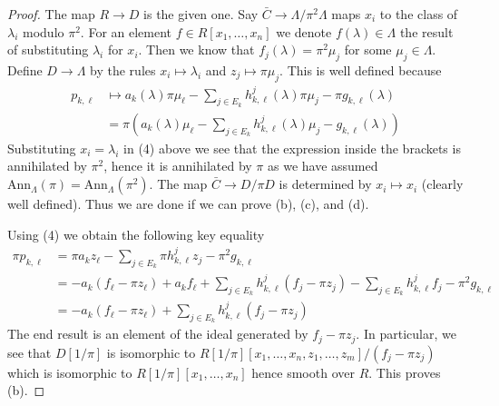 \begin{proof}
\medskip\noindent
The map $R \to D$ is the given one.
Say $\bar C \to \Lambda/\pi^2\Lambda$ maps $x_i$
to the class of $\lambda_i$ modulo $\pi^2$. For an element
$f \in R[x_1, \ldots, x_n]$ we denote $f(\lambda) \in \Lambda$
the result of substituting $\lambda_i$ for $x_i$. Then we know that
$f_j(\lambda) = \pi^2 \mu_j$ for some $\mu_j \in \Lambda$.
Define $D \to \Lambda$ by the rules $x_i \mapsto \lambda_i$ and
$z_j \mapsto \pi\mu_j$. This is well defined because
\begin{align*}
p_{k, \ell} & \mapsto
a_k(\lambda) \pi \mu_\ell -
\sum\nolimits_{j \in E_k} h_{k, \ell}^j(\lambda) \pi \mu_j
- \pi g_{k, \ell}(\lambda) \\
& =
\pi\left(a_k(\lambda) \mu_\ell -
\sum\nolimits_{j \in E_k} h_{k, \ell}^j(\lambda) \mu_j
- g_{k, \ell}(\lambda)\right)
\end{align*}
Substituting $x_i = \lambda_i$ in (4) above we see that the expression
inside the brackets is annihilated by $\pi^2$, hence it is annihilated
by $\pi$ as we have assumed
$\text{Ann}_\Lambda(\pi) = \text{Ann}_\Lambda(\pi^2)$.
The map $\bar C \to D/\pi D$ is determined by $x_i \mapsto x_i$
(clearly well defined). Thus we are done if we can prove (b), (c), and (d).

\medskip\noindent
Using (4) we obtain the following key equality
\begin{align*}
\pi p_{k, \ell} & =
\pi a_k z_\ell - \sum\nolimits_{j \in E_k} \pi h_{k, \ell}^jz_j
- \pi^2 g_{k, \ell} \\
& =
- a_k (f_\ell - \pi z_\ell) + a_k f_\ell +
\sum\nolimits_{j \in E_k} h_{k, \ell}^j (f_j - \pi z_j) -
\sum\nolimits_{j \in E_k} h_{k, \ell}^j f_j - \pi^2 g_{k, \ell} \\
& =
-a_k(f_\ell - \pi z_\ell) +
\sum\nolimits_{j \in E_k} h_{k, \ell}^j(f_j - \pi z_j)
\end{align*}
The end result is an element of the ideal generated by $f_j - \pi z_j$.
In particular, we see that $D[1/\pi]$ is isomorphic to
$R[1/\pi][x_1, \ldots, x_n, z_1, \ldots, z_m]/(f_j - \pi z_j)$
which is isomorphic to $R[1/\pi][x_1, \ldots, x_n]$ hence smooth
over $R$. This proves (b).


\end{proof}

